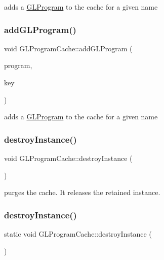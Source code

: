 adds a \hyperlink{classGLProgram}{G\+L\+Program} to the cache for a given name \mbox{\label{classGLProgramCache_a2a71f5f18bd022f43de7fc55f7e1252a}} 
\subsubsection{\texorpdfstring{add\+G\+L\+Program()}{addGLProgram()}\hspace{0.1cm}{\footnotesize\ttfamily [2/2]}}
{\footnotesize\ttfamily void G\+L\+Program\+Cache\+::add\+G\+L\+Program (\begin{DoxyParamCaption}\item[{\hyperlink{classGLProgram}{G\+L\+Program} $\ast$}]{program,  }\item[{const std\+::string \&}]{key }\end{DoxyParamCaption})}

adds a \hyperlink{classGLProgram}{G\+L\+Program} to the cache for a given name \mbox{\label{classGLProgramCache_a4a222023d3d21b6f4ed74077a4524e59}} 
\subsubsection{\texorpdfstring{destroy\+Instance()}{destroyInstance()}\hspace{0.1cm}{\footnotesize\ttfamily [1/2]}}
{\footnotesize\ttfamily void G\+L\+Program\+Cache\+::destroy\+Instance (\begin{DoxyParamCaption}{ }\end{DoxyParamCaption})\hspace{0.3cm}{\ttfamily [static]}}

purges the cache. It releases the retained instance. \mbox{\label{classGLProgramCache_aa4732816023ff32baff52867cd82d523}} 
\subsubsection{\texorpdfstring{destroy\+Instance()}{destroyInstance()}\hspace{0.1cm}{\footnotesize\ttfamily [2/2]}}
{\footnotesize\ttfamily static void G\+L\+Program\+Cache\+::destroy\+Instance (\begin{DoxyParamCaption}{ }\end{DoxyParamCaption})\hspace{0.3cm}{\ttfamily [static]}}

